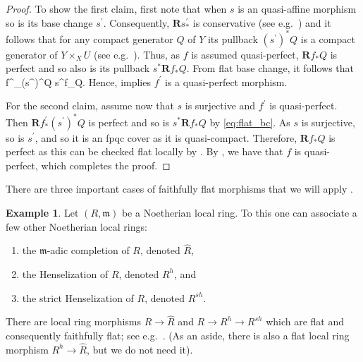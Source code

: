 \documentclass[11pt]{amsart}
\let\oldequation\equation
\let\oldendequation\endequation
\renewenvironment{equation}{\linenomathNonumbers\oldequation}{\oldendequation\endlinenomath}
\theoremstyle{plain}
\theoremstyle{definition}
\newtheorem{example}[theorem]{Example}
\numberwithin{equation}{section}
\numberwithin{theorem}{section}
\begin{document}
\begin{proof}
    To show the first claim, first note that when $s$ is an quasi-affine morphism so is its base change $s^\prime$. Consequently, $\mathbf{R}s^\prime_\ast$ is conservative (see e.g.\ \cite[Corollary 2.8]{Hall/Rydh:2017}) and it follows that for any compact generator $Q$ of $Y$ its pullback $(s^\prime)^\ast Q$ is a compact generator of $Y\times_X U$ (see e.g.\ \cite[\href{https://stacks.math.columbia.edu/tag/0E4R}{Tag 0E4R}]{StacksProject}).
    Thus, as $f$ is assumed quasi-perfect, $\mathbf{R}f_\ast Q$ is perfect and so also is its pullback $s^\ast \mathbf{R}f_\ast Q$. From flat base change, it follows that 
    \begin{equation}
        \label{eq:flat_bc}
        f^\prime_\ast (s^\prime)^\ast Q \cong s^\ast {}f_\ast Q.
    \end{equation}
    Hence,  implies $f^\prime$ is a quasi-perfect morphism.

    For the second claim, assume now that $s$ is surjective and $f^\prime$ is quasi-perfect. 
    Then $\mathbf{R}f^\prime_\ast (s^\prime)^\ast Q$ is perfect and so is $s^\ast \mathbf{R}f_\ast Q$ by \cref{eq:flat_bc}. 
    As $s$ is surjective, so is $s^\prime$, and so it is an fpqc cover as it is quasi-compact.
    Therefore, $\mathbf{R}f_\ast Q$ is perfect as this can be checked flat locally by .
    By , we have that $f$ is quasi-perfect, which completes the proof.
\end{proof}

There are three important cases of faithfully flat morphisms that we will apply .

\begin{example}
    \label{ex:adic_completion_Henselization}
    Let $(R,\mathfrak{m})$ be a Noetherian local ring. 
    To this one can associate a few other Noetherian local rings:
    \begin{enumerate}
        \item the $\mathfrak{m}$-adic completion of $R$, denoted $\widehat{R}$,
        \item the Henselization of $R$, denoted $R^h$, and
        \item the strict Henselization of $R$, denoted $R^{sh}$.
    \end{enumerate}
    There are local ring morphisms $R\to \widehat{R}$ and $R \to R^ h \to R^{sh}$ which are flat
    and consequently faithfully flat; see e.g.\ \cite[\href{https://stacks.math.columbia.edu/tag/00MC}{Tag 00MC} and \href{https://stacks.math.columbia.edu/tag/07QM}{Tag 07QM}]{StacksProject}.
    (As an aside, there is also a flat local ring morphism $R^h\to \widehat{R}$, but we do not need it).
\end{example}
\end{document}

